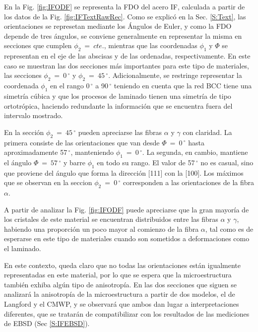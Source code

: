 En la Fig. \ref{fig:IFODF} se representa la FDO del acero IF, calculada a partir de los datos de la Fig. \ref{fig:IFTextRawRec}.
Como se explicó en la Sec. \ref{S:Text}, las orientaciones se represetan mediante los Ángulos de Euler, y como la FDO depende de tres ángulos, se conviene generalmente en representar la misma en secciones que cumplen $\phi_2 \ = \ cte.$, mientras que las coordenadas $\phi_1$ y $\Phi$ se representan en el eje de las abscisas y de las ordenadas, respectivamente.
En este caso se muestran las dos secciones más importantes para este tipo de materiales, las secciones $\phi_2 \ = \ 0$\,$^{\circ}$ y $\phi_2 \ = \ 45$\,$^{\circ}$.
Adicionalmente, se restringe representar la coordenada $\phi_1$ en el rango 0\,$^{\circ}$ a 90\,$^{\circ}$ teniendo en cuenta que la red BCC tiene una simetría cúbica y que los procesos de laminado tienen una simetría de tipo ortotrópica, haciendo redundante la información que se encuentra fuera del intervalo mostrado.

En la sección $\phi_2 \ = \ 45$\,$^{\circ}$ pueden apreciarse las fibras $\alpha$ y $\gamma$ con claridad. 
La primera consiste de las orientaciones que van desde $\Phi \ = \ 0$\,$^{\circ}$ hasta aproximadamente 57\,$^{\circ}$, manteniendo $\phi_1 \ = \ 0$\,$^{\circ}$.
La segunda, en cambio, mantiene el ángulo $\Phi \ = \ 57$\,$^{\circ}$ y barre $\phi_1$ en todo su rango. El valor de 57\,$^{\circ}$ no es casual, sino que proviene del ángulo que forma la dirección [111] con la [100].
Los máximos que se observan en la seccion $\phi_2 \ = \ 0$\,$^{\circ}$ corresponden a las orientaciones de la fibra $\alpha$.

A partir de analizar la Fig. \ref{fig:IFODF} puede apreciarse que la gran mayoría de los cristales de este material se encuentran distribuidos entre las fibras $\alpha$ y $\gamma$, habiendo una proporción un poco mayor al comienzo de la fibra $\alpha$, tal como es de esperarse en este tipo de materiales cuando son sometidos a deformaciones como el laminado.

En este contexto, queda claro que no todas las orientaciones están igualmente representadas en este material, por lo que se espera que la microestructura también exhiba algún tipo de anisotropía.
En las dos secciones que siguen se analizará la anisotropía de la microestructura a partir de dos modelos, el de Langford y el CMWP, y se observará que ambos dan lugar a interpretaciones diferentes, que se tratarán de compatibilizar con los resultados de las mediciones de EBSD (Sec \ref{S:IFEBSD}).

